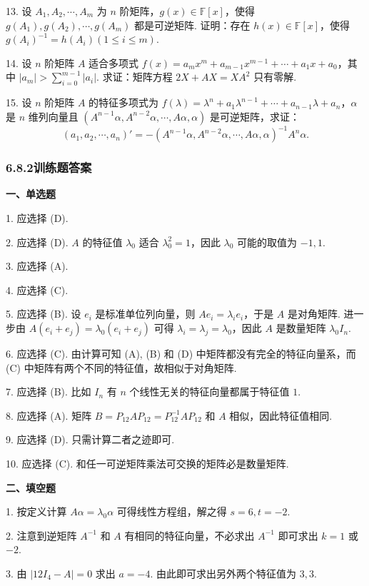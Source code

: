 \documentclass[UTF8, 12pt, fontset=fandol, oneside]{ctexart}
\begin{document}
13. 设 $A_1,A_2,\cdots,A_m$ 为 $n$ 阶矩阵，$g(x)\in\mathbb{F}[x]$，使得 $g(A_1),g(A_2),\cdots,g(A_m)$ 都是可逆矩阵. 证明：存在 $h(x)\in\mathbb{F}[x]$，使得 $g(A_i)^{-1}=h(A_i)(1\le i\le m)$.

14. 设 $n$ 阶矩阵 $A$ 适合多项式 $f(x)=a_mx^m+a_{m-1}x^{m-1}+\cdots+a_1x+a_0$，其中 $|a_m|>\sum_{i=0}^{m-1}|a_i|$. 求证：矩阵方程 $2X+AX=XA^2$ 只有零解.

15. 设 $n$ 阶矩阵 $A$ 的特征多项式为 $f(\lambda)=\lambda^n+a_1\lambda^{n-1}+\cdots+a_{n-1}\lambda+a_n$，$\alpha$ 是 $n$ 维列向量且 $(A^{n-1}\alpha,A^{n-2}\alpha,\cdots,A\alpha,\alpha)$ 是可逆矩阵，求证：
\[
(a_1,a_2,\cdots,a_n)'=-(A^{n-1}\alpha,A^{n-2}\alpha,\cdots,A\alpha,\alpha)^{-1}A^n\alpha.
\]

\subsubsection*{6.8.2\quad 训练题答案}

\noindent\textbf{一、单选题}

1. 应选择 (D).

2. 应选择 (D). $A$ 的特征值 $\lambda_0$ 适合 $\lambda_0^2=1$，因此 $\lambda_0$ 可能的取值为 $-1,1$.

3. 应选择 (A).

4. 应选择 (C).

5. 应选择 (B). 设 $e_i$ 是标准单位列向量，则 $Ae_i=\lambda_ie_i$，于是 $A$ 是对角矩阵. 进一步由 $A(e_i+e_j)=\lambda_0(e_i+e_j)$ 可得 $\lambda_i=\lambda_j=\lambda_0$，因此 $A$ 是数量矩阵 $\lambda_0I_n$.

6. 应选择 (C). 由计算可知 (A), (B) 和 (D) 中矩阵都没有完全的特征向量系，而 (C) 中矩阵有两个不同的特征值，故相似于对角矩阵.

7. 应选择 (B). 比如 $I_n$ 有 $n$ 个线性无关的特征向量都属于特征值 $1$.

8. 应选择 (A). 矩阵 $B=P_{12}AP_{12}=P_{12}^{-1}AP_{12}$ 和 $A$ 相似，因此特征值相同.

9. 应选择 (D). 只需计算二者之迹即可.

10. 应选择 (C). 和任一可逆矩阵乘法可交换的矩阵必是数量矩阵.

\noindent\textbf{二、填空题}

1. 按定义计算 $A\alpha=\lambda_0\alpha$ 可得线性方程组，解之得 $s=6,t=-2$.

2. 注意到逆矩阵 $A^{-1}$ 和 $A$ 有相同的特征向量，不必求出 $A^{-1}$ 即可求出 $k=1$ 或 $-2$.

3. 由 $|12I_4-A|=0$ 求出 $a=-4$. 由此即可求出另外两个特征值为 $3,3$.
\end{document}
